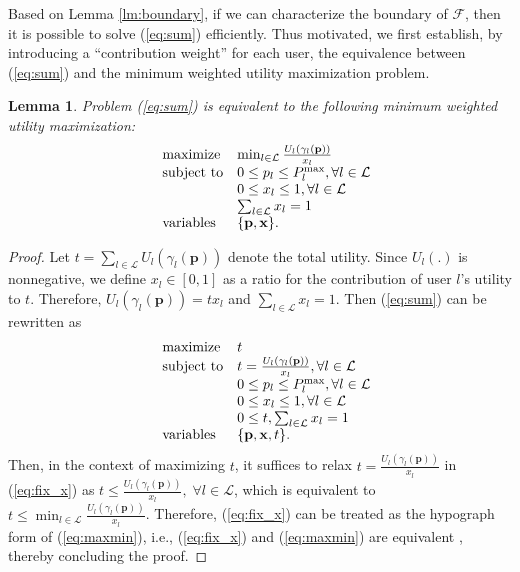 \documentclass[10pt,journal,letterpaper,compsoc]{IEEEtran}
\newtheorem{lm}{Lemma}[section]
\begin{document}
Based on Lemma \ref{lm:boundary}, if we can characterize the boundary of $\mathcal{F}$, then it is possible to solve (\ref{eq:sum}) efficiently. Thus motivated, we first establish, by introducing a ``contribution weight'' for each user, the equivalence between (\ref{eq:sum}) and the minimum weighted utility maximization problem.
\begin{lm}
Problem (\ref{eq:sum}) is equivalent to the following minimum weighted utility maximization:
\begin{equation}\begin{array}
[c]{lll}&{\text{maximize} }&\min_{l\in\mathcal{L}}\frac{U_l(\gamma_l(\mathbf{p}))}{x_l}
\\
&\text{subject to}& 0\leq p_l\leq P_l^{\max}, \forall l\in\mathcal{L}
\\
&& 0\leq x_l\leq 1, \forall l\in\mathcal{L}
\\
&& \sum_{l\in\mathcal{L}} x_l =1
\\
& \text{variables}& \{\mathbf{p},\mathbf{x}\}.
\end{array}
\label{eq:maxmin}
\end{equation}
\label{lm:maxmin}
\end{lm}
\begin{proof}
Let $t=\sum_{l\in\mathcal{L}}U_l(\gamma_l(\mathbf{p}))$ denote the total utility. Since $U_l(.)$ is nonnegative, we define $x_l\in[0,1]$ as a ratio for the contribution of user $l$'s utility to $t$. Therefore, $U_l(\gamma_l(\mathbf{p}))=tx_l$ and $\sum_{l\in\mathcal{L}} x_l =1$. Then (\ref{eq:sum}) can be rewritten as
\begin{equation}\begin{array}
[c]{lll}&{\text{maximize} }&t
\\
&\text{subject to}& t=\frac{U_l(\gamma_l(\mathbf{p}))}{x_l}, \forall l\in\mathcal{L}
\\
&&0\leq p_l\leq P_l^{\max}, \forall l\in\mathcal{L}
\\
&& 0\leq x_l\leq 1, \forall l\in\mathcal{L}
\\
&&0\le t, \sum_{l\in\mathcal{L}} x_l =1
\\
& \text{variables}& \{\mathbf{p},\mathbf{x},t\}.
\end{array}
\label{eq:fix_x}
\end{equation}
Then, in the context of maximizing $t$, it suffices to relax $t=\frac{U_l(\gamma_l(\mathbf{p}))}{x_l}$ in (\ref{eq:fix_x}) as $t\le\frac{U_l(\gamma_l(\mathbf{p}))}{x_l}, \;\forall l\in\mathcal{L}$, which is equivalent to $t\le\min_{l\in\mathcal{L}}\frac{U_l(\gamma_l(\mathbf{p}))}{x_l}$. Therefore, (\ref{eq:fix_x}) can be treated as the hypograph form of (\ref{eq:maxmin}), i.e., (\ref{eq:fix_x}) and (\ref{eq:maxmin}) are equivalent \cite{boyd:2004}, thereby concluding the proof.
\end{proof}
\end{document}
